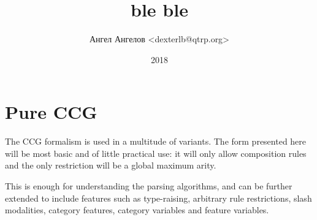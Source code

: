 \documentclass[12pt]{extarticle}
\title{ble ble}
\author{Ангел Ангелов <dexterlb@qtrp.org>}
\date{2018}
\theoremstyle{definition} \newtheorem{defn}{Definition}
\theoremstyle{definition} \newtheorem{prop}{Proposition}
\theoremstyle{definition} \newtheorem{property}{Property}
\begin{document}

\section{Pure CCG}
The CCG formalism is used in a multitude of variants. The form presented here
will be most basic and of little practical use: it will only allow composition
rules and the only restriction will be a global maximum arity.

This is enough for understanding the parsing algorithms, and can be further
extended to include features such as type-raising,
arbitrary rule restrictions, slash modalities,
category features, category variables and feature variables.
\end{document}
